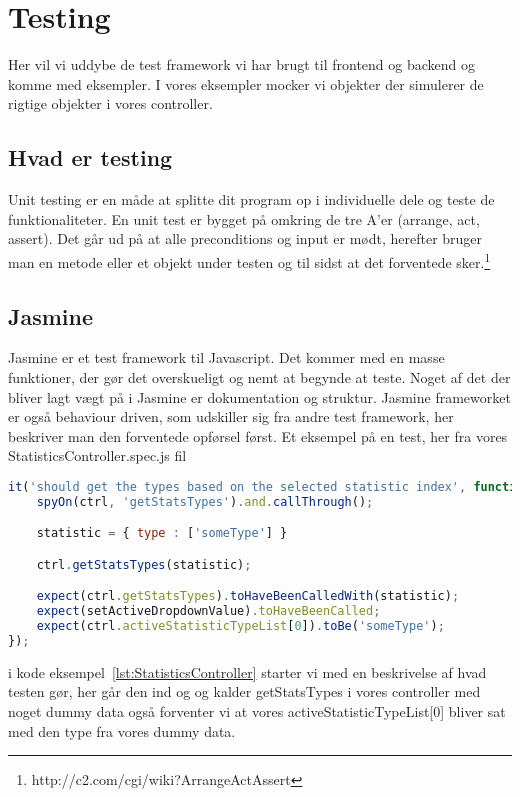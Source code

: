 \section{Testing}
Her vil vi uddybe de test framework vi har brugt til frontend og backend og komme
med eksempler. I vores eksempler mocker vi objekter der simulerer de rigtige objekter i vores controller.
\subsection{Hvad er testing}
Unit testing er en måde at splitte dit program op i individuelle dele og teste de funktionaliteter.
En unit test er bygget på omkring de tre A'er (arrange, act, assert). Det går ud på at alle
preconditions og input er mødt, herefter bruger man en metode eller et objekt under testen og til sidst at det forventede sker.\footnote{http://c2.com/cgi/wiki?ArrangeActAssert}
\subsection{Jasmine}
Jasmine er et test framework til Javascript. Det kommer med en masse funktioner, 
der gør det overskueligt og nemt at begynde at teste.
Noget af det der bliver lagt vægt på i Jasmine er dokumentation og struktur. Jasmine frameworket er 
også behaviour driven, som udskiller sig fra andre test framework, her beskriver man den forventede opførsel først.
Et eksempel på en test, her fra vores StatisticsController.spec.js fil
\begin{lstlisting}[caption={StatisticsController.spec.js}, language={JavaScript}, label={lst:StatisticsController}]
it('should get the types based on the selected statistic index', function() {
    spyOn(ctrl, 'getStatsTypes').and.callThrough();

    statistic = { type : ['someType'] }

    ctrl.getStatsTypes(statistic);

    expect(ctrl.getStatsTypes).toHaveBeenCalledWith(statistic);
    expect(setActiveDropdownValue).toHaveBeenCalled;
    expect(ctrl.activeStatisticTypeList[0]).toBe('someType');
});
\end{lstlisting}
i kode eksempel~\ref{lst:StatisticsController} starter vi med en beskrivelse af hvad testen gør, her går den ind og og kalder getStatsTypes i vores controller
med noget dummy data også forventer vi at vores activeStatisticTypeList[0] bliver sat med den type fra vores dummy data.

